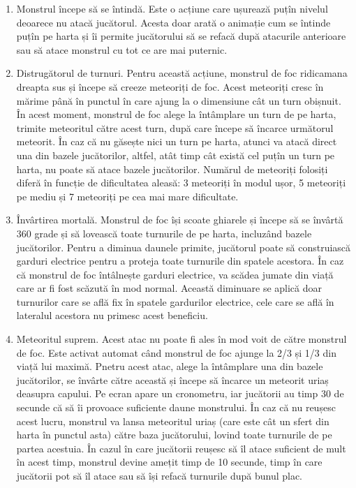 \documentclass[12pt, a4paper]{article}
\begin{document}
	\begin{enumerate}
		\item Monstrul începe să se întindă. Este o acțiune care ușurează puțîn nivelul deoarece nu atacă jucătorul. Acesta doar arată o animație cum se întinde puțîn pe harta și îi permite jucătorului să se refacă după atacurile anterioare sau să atace monstrul cu tot ce are mai puternic.
		\item Distrugătorul de turnuri. Pentru această acțiune, monstrul de foc ridicamana dreapta sus și începe să creeze meteoriți de foc. Acest meteoriți cresc în mărime până în punctul în care ajung la o dimensiune cât un turn obișnuit. În acest moment, monstrul de foc alege la întâmplare un turn de pe harta, trimite meteoritul către acest turn, după care începe să încarce următorul meteorit. În caz că nu găsește nici un turn pe harta, atunci va atacă direct una din bazele jucătorilor, altfel, atât timp cât există cel puțîn un turn pe harta, nu poate să atace bazele jucătorilor. Numărul de meteoriți folosiți diferă în funcție de dificultatea aleasă: 3 meteoriți în modul ușor, 5 meteoriți pe mediu și 7 meteoriți pe cea mai mare dificultate.
		\item Învârtirea mortală. Monstrul de foc își scoate ghiarele și începe să se învârtă 360 grade și să lovească toate turnurile de pe harta, incluzând bazele jucătorilor. Pentru a diminua daunele primite, jucătorul poate să construiască garduri electrice pentru a proteja toate turnurile din spatele acestora. În caz că monstrul de foc întâlnește garduri electrice, va scădea jumate din viață care ar fi fost scăzută în mod normal. Această diminuare se aplică doar turnurilor care se află fix în spatele gardurilor electrice, cele care se află în lateralul acestora nu primesc acest beneficiu.
		\item Meteoritul suprem. Acest atac nu poate fi ales în mod voit de către monstrul de foc. Este activat automat când monstrul de foc ajunge la 2/3 și 1/3 din viață lui maximă. Pnetru acest atac, alege la întâmplare una din bazele jucătorilor, se învârte către această și începe să încarce un meteorit uriaș deasupra capului. Pe ecran apare un cronometru, iar jucătorii au timp 30 de secunde că să îi provoace suficiente daune monstrului. În caz că nu reușesc acest lucru, monstrul va lansa meteoritul uriaș (care este cât un sfert din harta în punctul asta) către baza jucătorului, lovind toate turnurile de pe partea acestuia. În cazul în care jucătorii reușesc să îl atace suficient de mult în acest timp, monstrul devine amețit timp de 10 secunde, timp în care jucătorii pot să îl atace sau să își refacă turnurile după bunul plac.
	\end{enumerate}
	
\end{document}
